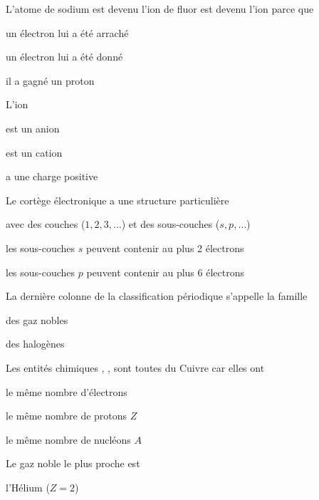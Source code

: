 \vspace*{-18pt}
\begin{multicols}{2}
  \begin{qcm}{
    L'atome de \variationSujet
    {sodium  est devenu l'ion }
    {de fluor  est devenu l'ion }
    parce que
  }
    \item\reponseQCM un électron lui a été arraché
    \item un électron lui a été donné
    \item il a gagné un proton
  \end{qcm}
  \begin{qcm}{
    L'ion 
  }
    \item est un anion
    \item\reponseQCM est un cation
    \item\reponseQCM a une charge positive
  \end{qcm}
  \begin{qcm}{Le cortège électronique a une structure particulière}
    \item\reponseQCM avec des couches ($1, 2, 3, \ldots$) et des sous-couches ($s, p, \ldots$)
    \item\reponseQCM les sous-couches $s$ peuvent contenir au plus 2 électrons
    \item\reponseQCM les sous-couches $p$ peuvent contenir au plus 6 électrons
  \end{qcm}
  \begin{qcm}{La dernière colonne de la classification périodique s'appelle la famille}
    \item\reponseQCM des gaz nobles
    \item des halogènes
  \end{qcm}
  \begin{qcm}{
    Les entités chimiques , ,  sont toutes du Cuivre car elles ont
  }
    \item le même nombre d'électrons
    \item\reponseQCM le même nombre de protons $Z$
    \item le même nombre de nucléons $A$
  \end{qcm}
  \begin{qcm}{
    Le gaz noble le plus proche  est
  }
    \item\reponseQCM l'Hélium ($Z = 2$)

\end{qcm}
\end{multicols}

